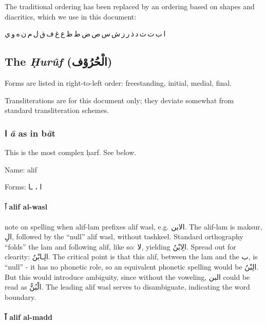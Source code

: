 \documentclass[11pt]{article}
\begin{document}
The traditional ordering has been replaced by an ordering based on
shapes and diacritics, which we use in this document:

\vspace{10pt}

\textarabic{ا\,ب\,ت\,ث\,د\,ذ\,ر\,ز\,ش\,س\,ص\,ض\,ط\,ظ\,ع\,غ\,ف\,ق\,ل\,م\,ن\,ه\,و\,ي}

\subsection{The \textit{Ḥurûf} (\textarabic{الْحُرُوْف})}

Forms are listed in right-to-left order: freestanding, initial,
medial, final.

Transliterations are for this document only; they deviate somewhat
from standard transliteration schemes.

\subsubsection{ \textarabic{ا}  \textit{ā} as in b\textit{ā}t}
This is the most complex ḥarf. See below.

\noindent Name: alif

\noindent Forms: \textarabic{ا ، ـا}

\paragraph{\textarabic{ٱ} alif al-wasl}

note on spelling when alif-lam prefixes alif wasl, e.g.
\textarabic{الابن}. The alif-lam is maksur, \textarabic{الِ}, followed
by the “null” alif wasl, without tashkeel. Standard orthography
“folds” the lam and following alif, like so: \textarabic{لا}, yielding
\textarabic{الِابْنُ}. Spread out for clearity: \textarabic{الِـابْنُ}. The
critical point is that this alif, between the lam and the
\textarabic{ب}, is “null” - it has no phonetic role, so an equivalent
phonetic spelling would be \textarabic{الِبْنُ}. But this would introduce
ambiguity, since without the voweling, \textarabic{البن} could be read
as \textarabic{الْبُنُّ}. The leading alif wasl serves to disambiguate,
indicating the word boundary.

\paragraph{\textarabic{آ} alif al-madd}
\end{document}
